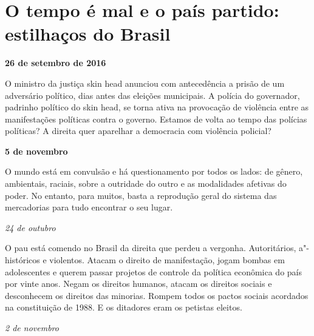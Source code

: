 \chapter{O tempo é mal e o país partido: estilhaços do Brasil}

\begin{flushright}
\textbf{26 de setembro de 2016}
\end{flushright}

O ministro da justiça skin head anunciou com antecedência a prisão de um
adversário político, dias antes das eleições municipais. A polícia do
governador, padrinho político do skin head, se torna ativa na provocação
de violência entre as manifestações políticas contra o governo. Estamos
de volta ao tempo das polícias políticas? A direita quer aparelhar a
democracia com violência policial?

\begin{flushright}
\textbf{5 de novembro}
\end{flushright}

O mundo está em convulsão e há questionamento por todos os lados: de
gênero, ambientais, raciais, sobre a outridade do outro e as modalidades
afetivas do poder. No entanto, para muitos, basta a reprodução geral do
sistema das mercadorias para tudo encontrar o seu lugar.

\begin{flushright}
\emph{24 de outubro}
\end{flushright}

O pau está comendo no Brasil da direita que perdeu a vergonha.
Autoritários, a"-históricos e violentos. Atacam o direito de
manifestação, jogam bombas em adolescentes e querem passar projetos de
controle da política econômica do país por vinte anos. Negam os direitos
humanos, atacam os direitos sociais e desconhecem os direitos das
minorias. Rompem todos os pactos sociais acordados na constituição de
1988. E os ditadores eram os petistas eleitos.

\begin{flushright}
\emph{2 de novembro}
\end{flushright}

